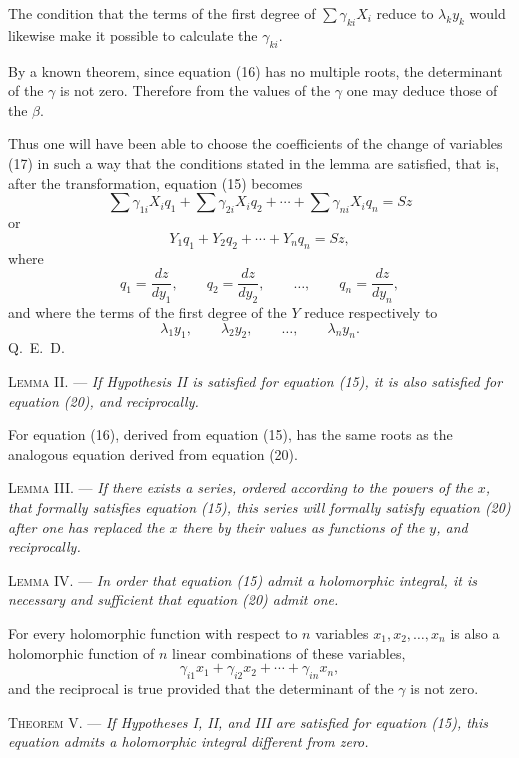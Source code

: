 \documentclass[11pt]{article}
\begin{document}
The condition that the terms of the first degree of $\sum\gamma_{ki}X_i$ reduce to $\lambda_ky_k$ would likewise make it possible to calculate the $\gamma_{ki}$.

By a known theorem, since equation (16) has no multiple roots, the determinant of the $\gamma$ is not zero. Therefore from the values of the $\gamma$ one may deduce those of the $\beta$.

Thus one will have been able to choose the coefficients of the change of variables (17) in such a way that the conditions stated in the lemma are satisfied, that is, after the transformation, equation (15) becomes
\[
\sum\gamma_{1i}X_iq_1+\sum\gamma_{2i}X_iq_2+\cdots+\sum\gamma_{ni}X_iq_n=Sz
\]
or
\begin{equation*}\tag{20}
Y_1q_1+Y_2q_2+\cdots+Y_nq_n=Sz,
\end{equation*}
where
\[
q_1=\frac{dz}{dy_1},\qquad q_2=\frac{dz}{dy_2},\qquad \ldots,\qquad q_n=\frac{dz}{dy_n},
\]
and where the terms of the first degree of the $Y$ reduce respectively to
\[
\lambda_1y_1,
\qquad \lambda_2y_2,
\qquad \ldots,
\qquad \lambda_ny_n.
\]
\hfill\mbox{Q. E. D.}

\noindent\textsc{Lemma II.} --- \emph{If Hypothesis II is satisfied for equation (15), it is also satisfied for equation (20), and reciprocally.}

For equation (16), derived from equation (15), has the same roots as the analogous equation derived from equation (20).

\noindent\textsc{Lemma III.} --- \emph{If there exists a series, ordered according to the powers of the $x$, that formally satisfies equation (15), this series will formally satisfy equation (20) after one has replaced the $x$ there by their values as functions of the $y$, and reciprocally.}

\noindent\textsc{Lemma IV.} --- \emph{In order that equation (15) admit a holomorphic integral, it is necessary and sufficient that equation (20) admit one.}

For every holomorphic function with respect to $n$ variables $x_1,x_2,\ldots,x_n$ is also a holomorphic function of $n$ linear combinations of these variables,
\[
\gamma_{i1}x_1+\gamma_{i2}x_2+\cdots+\gamma_{in}x_n,
\]
and the reciprocal is true provided that the determinant of the $\gamma$ is not zero.

\noindent\textsc{Theorem V.} --- \emph{If Hypotheses I, II, and III are satisfied for equation (15), this equation admits a holomorphic integral different from zero.}
\end{document}
